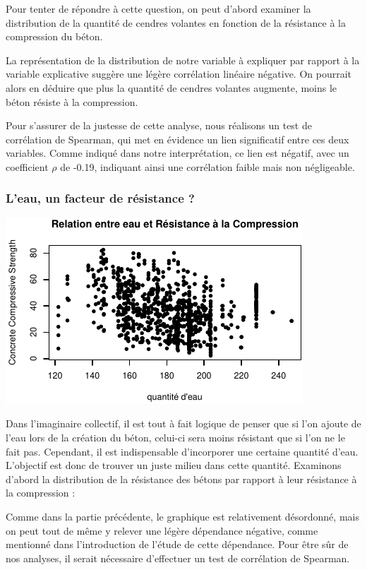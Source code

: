 \documentclass[
  12pt,
]{article}
\begin{document}
Pour tenter de répondre à cette question, on peut d'abord examiner la
distribution de la quantité de cendres volantes en fonction de la
résistance à la compression du béton.

La représentation de la distribution de notre variable à expliquer par
rapport à la variable explicative suggère une légère corrélation
linéaire négative. On pourrait alors en déduire que plus la quantité de
cendres volantes augmente, moins le béton résiste à la compression.

Pour s'assurer de la justesse de cette analyse, nous réalisons un test
de corrélation de Spearman, qui met en évidence un lien significatif
entre ces deux variables. Comme indiqué dans notre interprétation, ce
lien est négatif, avec un coefficient \(\rho\) de -0.19, indiquant ainsi
une corrélation faible mais non négligeable.

\subsubsection{L'eau, un facteur de résistance
?}\label{leau-un-facteur-de-ruxe9sistance}

\begin{center}\includegraphics{rmd_final_files/figure-latex/unnamed-chunk-18-1} \end{center}

Dans l'imaginaire collectif, il est tout à fait logique de penser que si
l'on ajoute de l'eau lors de la création du béton, celui-ci sera moins
résistant que si l'on ne le fait pas. Cependant, il est indispensable
d'incorporer une certaine quantité d'eau. L'objectif est donc de trouver
un juste milieu dans cette quantité. Examinons d'abord la distribution
de la résistance des bétons par rapport à leur résistance à la
compression :

Comme dans la partie précédente, le graphique est relativement
désordonné, mais on peut tout de même y relever une légère dépendance
négative, comme mentionné dans l'introduction de l'étude de cette
dépendance. Pour être sûr de nos analyses, il serait nécessaire
d'effectuer un test de corrélation de Spearman.
\end{document}
